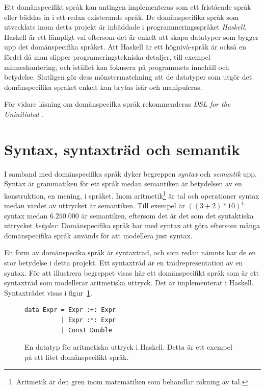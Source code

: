 \begin{draft}
Ett domänspecifikt språk kan antingen implementeras som ett fristående språk
eller bäddas in i ett redan existerande språk. De domänspecifika språk som
utvecklats inom detta projekt är inbäddade i programmeringsspråket
\textit{Haskell}. Haskell är ett lämpligt val eftersom det är enkelt att skapa
datatyper som bygger upp det domänspecifika språket. Att Haskell är ett
högnivå-språk är också en fördel då man slipper programeringstekniska detaljer,
till exempel minneshantering, och istället kan fokusera på programmets innehåll
och betydelse. Slutligen gör dess mönstermatchning att de datatyper som utgör
det domänspecifika språket enkelt kan brytas isär och manipuleras.

För vidare läsning om domänspecifka språk rekommenderas \textit{DSL for the Uninitiated} \cite{DSLU}. 

\section{Syntax, syntaxträd och semantik}\label{sec:syntax}

I samband med domänspecifika språk dyker begreppen \textit{syntax} och
\textit{semantik} upp. Syntax är grammatiken för ett språk medan semantiken är
betydelsen av en konstruktion, en mening, i språket. Inom
aritmetik\footnote{Aritmetik är den gren inom matematiken som behandlar
räkning av tal.} är tal och operationer syntax medan värdet av uttrycket är semantiken.
Till exempel är $((3 + 2) * 10)^4$ syntax medan $6.250.000$ är semantiken,
eftersom det är det som det syntaktiska uttrycket \textit{betyder}.
Domänspecifika språk har med syntax att göra eftersom många domänspecifika språk
används för att modellera just syntax.

En form av domänspecika språk är syntaxträd, och som redan nämnts har de en stor
betydelse i detta projekt. Ett syntaxträd är en trädrepresentation av en syntax.
För att illustrera begreppet visas här ett domänspecifikt språk som är ett
syntaxträd som modellerar aritmetiska uttryck. Det är implementerat i Haskell.
Syntaxträdet visas i figur~\ref{fig:syntax_exempel}.

\begin{figure}[tph]
  \begin{lstlisting}
data Expr = Expr :+: Expr
          | Expr :*: Expr
          | Const Double
  \end{lstlisting}
  \caption{En datatyp för aritmetiska uttryck i Haskell. Detta är ett exempel på
           ett litet domänspecifikt språk.}\label{fig:syntax_exempel} 
\end{figure}


\end{draft}
